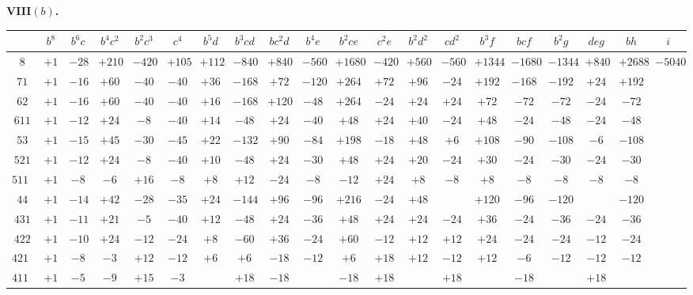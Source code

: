 \documentclass[12pt,a4paper]{article}
\theoremstyle{definition}
\begin{document}
\noindent\textbf{VIII$(b)$.}
\begin{center}
\tiny
\begin{tabular}{c|c|c|c|c|c|c|c|c|c|c|c|c|c|c|c|c|c|c|c}
& $b^8$ & $b^6c$ & $b^4c^2$ & $b^2c^3$ & $c^4$ & $b^5d$ & $b^3cd$ & $bc^2d$ & $b^4e$ & $b^2ce$ & $c^2e$ & $b^2d^2$ & $cd^2$ & $b^3f$ & $bcf$ & $b^2g$ & $deg$ & $bh$ & $i$ \\
\hline
$8$ & $+1$ & $-28$ & $+210$ & $-420$ & $+105$ & $+112$ & $-840$ & $+840$ & $-560$ & $+1680$ & $-420$ & $+560$ & $-560$ & $+1344$ & $-1680$ & $-1344$ & $+840$ & $+2688$ & $-5040$ \\
$71$ & $+1$ & $-16$ & $+60$ & $-40$ & $-40$ & $+36$ & $-168$ & $+72$ & $-120$ & $+264$ & $+72$ & $+96$ & $-24$ & $+192$ & $-168$ & $-192$ & $+24$ & $+192$ & \\
$62$ & $+1$ & $-16$ & $+60$ & $-40$ & $-40$ & $+16$ & $-168$ & $+120$ & $-48$ & $+264$ & $-24$ & $+24$ & $+24$ & $+72$ & $-72$ & $-72$ & $-24$ & $-72$ & \\
$611$ & $+1$ & $-12$ & $+24$ & $-8$ & $-40$ & $+14$ & $-48$ & $+24$ & $-40$ & $+48$ & $+24$ & $+40$ & $-24$ & $+48$ & $-24$ & $-48$ & $-24$ & $-48$ & \\
$53$ & $+1$ & $-15$ & $+45$ & $-30$ & $-45$ & $+22$ & $-132$ & $+90$ & $-84$ & $+198$ & $-18$ & $+48$ & $+6$ & $+108$ & $-90$ & $-108$ & $-6$ & $-108$ & \\
$521$ & $+1$ & $-12$ & $+24$ & $-8$ & $-40$ & $+10$ & $-48$ & $+24$ & $-30$ & $+48$ & $+24$ & $+20$ & $-24$ & $+30$ & $-24$ & $-30$ & $-24$ & $-30$ & \\
$5111$ & $+1$ & $-8$ & $-6$ & $+16$ & $-8$ & $+8$ & $+12$ & $-24$ & $-8$ & $-12$ & $+24$ & $+8$ & $-8$ & $+8$ & $-8$ & $-8$ & $-8$ & $-8$ & \\
$44$ & $+1$ & $-14$ & $+42$ & $-28$ & $-35$ & $+24$ & $-144$ & $+96$ & $-96$ & $+216$ & $-24$ & $+48$ & & $+120$ & $-96$ & $-120$ & & $-120$ & \\
$431$ & $+1$ & $-11$ & $+21$ & $-5$ & $-40$ & $+12$ & $-48$ & $+24$ & $-36$ & $+48$ & $+24$ & $+24$ & $-24$ & $+36$ & $-24$ & $-36$ & $-24$ & $-36$ & \\
$422$ & $+1$ & $-10$ & $+24$ & $-12$ & $-24$ & $+8$ & $-60$ & $+36$ & $-24$ & $+60$ & $-12$ & $+12$ & $+12$ & $+24$ & $-24$ & $-24$ & $-12$ & $-24$ & \\
$4211$ & $+1$ & $-8$ & $-3$ & $+12$ & $-12$ & $+6$ & $+6$ & $-18$ & $-12$ & $+6$ & $+18$ & $+12$ & $-12$ & $+12$ & $-6$ & $-12$ & $-12$ & $-12$ & \\
$41111$ & $+1$ & $-5$ & $-9$ & $+15$ & $-3$ & & $+18$ & $-18$ & & $-18$ & $+18$ & & $+18$ & & $-18$ & & $+18$ & & \\

\end{tabular}
\end{center}
\end{document}
